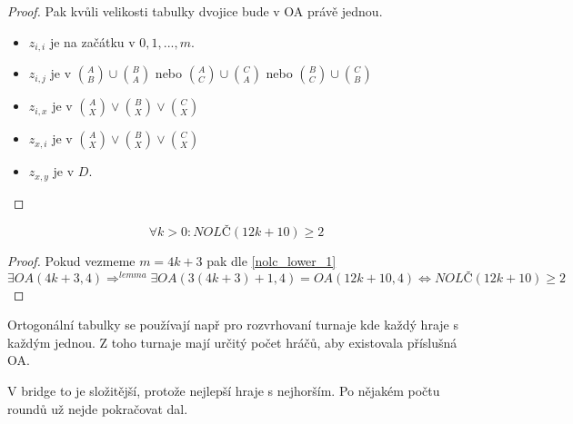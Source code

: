 \begin{proof}
	Pak kvůli velikosti tabulky dvojice bude v OA právě jednou.

	\begin{itemize}
		\item $z_{i, i}$ je na začátku v $0, 1, ..., m$.
		\item $z_{i, j}$ je  v $\binom{A}{B} \cup \binom{B}{A}$ nebo $\binom{A}{C} \cup \binom{C}{A}$ nebo $\binom{B}{C} \cup \binom{C}{B}$
		\item $z_{i, x}$ je v $\binom{A}{X} \lor \binom{B}{X} \lor \binom{C}{X}$
		\item $z_{x, i}$ je v $\binom{A}{X} \lor \binom{B}{X} \lor \binom{C}{X}$
		\item $z_{x, y}$ je v $D$.
	\end{itemize}

\end{proof}


\begin{theorem}
	\[ \forall k > 0: NOLČ(12 k + 10) \geq 2 \]
\end{theorem}
\begin{proof}
	Pokud vezmeme $m = 4k + 3$ pak dle \cref{nolc_lower_1}
	\[ \exists OA(4k + 3, 4) \Rightarrow^{lemma} \exists OA(3(4k + 3) + 1, 4) = OA(12k + 10, 4) \iff NOLČ(12k + 10) \geq 2 \]
\end{proof}

\begin{note}
	Ortogonální tabulky se používají např pro rozvrhovaní turnaje kde každý hraje s každým jednou.
	Z toho turnaje mají určitý počet hráčů, aby existovala příslušná OA.

	V bridge to je složitější, protože nejlepší hraje s nejhorším.
	Po nějakém počtu roundů už nejde pokračovat dal.
\end{note}
